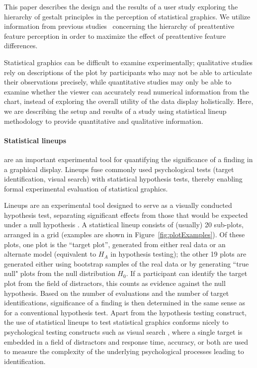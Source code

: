\documentclass[12pt]{article}\usepackage[]{graphicx}\usepackage[]{color}
\begin{document}
This paper describes the design and the results of a user study exploring the hierarchy of gestalt principles in the perception of statistical graphics. We utilize information from previous studies~\citep{heer:2014, robinson:03, healey1996high} concerning the hierarchy of preattentive feature perception in order to maximize the effect of preattentive feature differences. 


Statistical graphics can be difficult to examine experimentally; qualitative studies rely on descriptions of the plot by participants who may not be able to articulate their observations precisely, while quantitative studies may only be able to examine whether the viewer can accurately read numerical information from the chart, instead of exploring the overall utility of the data display holistically. Here, we are describing the setup and results of a study using statistical lineup methodology to provide quantitative and qualitative information.

\paragraph{Statistical lineups} are an important experimental tool for quantifying the significance of a finding in a graphical display. 
Lineups fuse commonly used psychological tests (target identification, visual search) \citep{visualreasoning} with statistical hypothesis tests, thereby enabling formal experimental evaluation of statistical graphics. 

Lineups are an experimental tool designed to serve as a visually conducted hypothesis test, separating significant effects from those that would be expected under a null hypothesis \citep{buja2009statistical, majumder2013validation,hofmann2012graphical, wickham2010graphical}. 
A statistical lineup consists of (usually) 20 sub-plots, arranged in a grid (examples are shown in Figure~\ref{fig:plotExamples}). 
Of these plots, one plot is the ``target plot'', generated from either real data or an alternate model (equivalent to $H_A$ in hypothesis testing); the other 19 plots are generated either using bootstrap samples of the real data or by generating ``true null" plots from the null distribution $H_0$. 
If a participant can identify the target plot from the field of distractors, this counts as evidence against the null hypothesis. 
Based on the number of evaluations and the number of target identifications, significance of a finding is then determined in the same sense as for a conventional hypothesis test. 
Apart from the hypothesis testing construct, the use of statistical lineups to test statistical graphics conforms nicely to psychological testing constructs such as visual search \citep{demita1981validity,treisman1980feature}, where a single target is embedded in a field of distractors and response time, accuracy, or both are used to measure the complexity of the underlying psychological processes leading to identification. 
\end{document}
